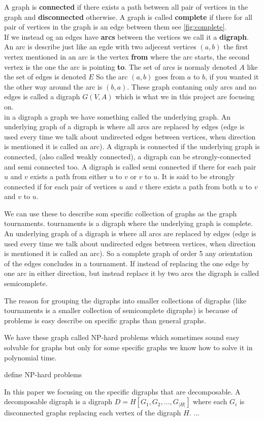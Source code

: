 A graph is \textbf{connected} if there exists a path between all pair of vertices in the graph and \textbf{disconnected} otherwise.
A graph is called \textbf{complete} if there for all pair of vertices in the graph is an edge between them see \autoref{fig:complete}.\\

If we instead og an edges have \textbf{arcs} between the vertices we call it a \textbf{digraph}.
An arc is describe just like an egde with two adjecent vertices $(a,b)$ the first vertex mentioned in an arc is the vertex \textbf{from} where the arc starts, the second vertex is the one the arc is pointing \textbf{to}. The set of arcs is normaly denoted $A$ like the set of edges is denoted $E$
So the arc $(a,b)$ goes from $a$ to $b$, if you wanted it the other way around the arc is $(b,a)$.
These graph contaning only arcs and no edges is called a digraph $G(V,A)$ which is what we in this project are focusing on.\\

in a digraph a graph we have something called the underlying graph. 
An underlying graph of a digraph is where all arcs are replaced by edges (edge is used every time we talk about undirected edges between vertices, when direction is mentioned it is called an arc).
A digraph is connected if the underlying graph is connected, (also called weakly connected), a digraph can be strongly-connected and semi connected too.
A digraph is called semi connected if there for each pair $u$ and $v$ exists a path from either $u$ to $v$ or $v$ to $u$. 
It is said to be strongly connected if for each pair of vertices $u$ and $v$ there exists a path from both $u$ to $v$ and $v$ to $u$.

We can use these to describe som specific collection of graphs as the graph tournaments.
tournaments is a digraph where the underlying graph is complete. 
An underlying graph of a digraph is where all arcs are replaced by edges (edge is used every time we talk about undirected edges between vertices, when direction is mentioned it is called an arc).
So a complete graph of order 5 any orientation of the edges concludes in a tournament.
If instead of replacing the one edge by one arc in either direction, but instead replace it by two arcs the digraph is called semicomplete.

The reason for grouping the digraphs into smaller collections of digraphs (like tournaments is a smaller collection of semicomplete digraphs) is because of problems is easy describe on specific graphs than general graphs.

We have these graph called NP-hard problems which sometimes sound easy solvable for graphs but only for some specific graphs we know how to solve it in polynomial time. 
\begin{definition}
    define NP-hard problems
\end{definition}

In this paper we focusing on the specific digraphs that are decomposable. 
A decomposable digraph is a digraph $D=H[G_1,G_2,\dots,G_|H|]$ where each $G_i$ is disconnected graphs replacing each vertex of the digraph $H$. ...
